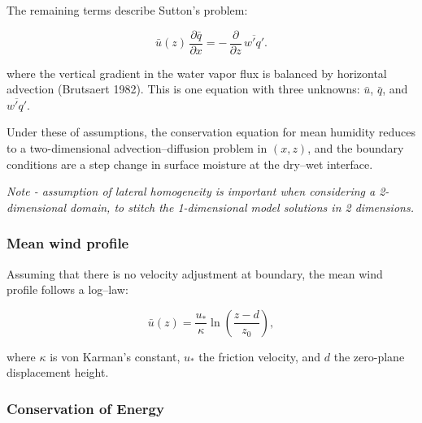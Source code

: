 \documentclass{article}
\begin{document}
    
    
    The remaining terms describe Sutton's problem: 
    
    \begin{equation}
    \bar u (z)\,\frac{\partial \bar q}{\partial x}
    = -\,\frac{\partial}{\partial z}\,\overline{w' q'} .
    \end{equation}
    
    where the vertical gradient in the water vapor flux is balanced by horizontal advection (Brutsaert 1982). This is one equation with three unknowns: $\bar u$, $\bar q$, and $\overline{w' q'}$. 
    
    
    Under these of assumptions, the conservation equation for mean humidity reduces to a two-dimensional advection--diffusion problem in $(x,z)$,
    and the boundary conditions are a step change in surface moisture at the dry--wet interface.
    
    \textit{Note - assumption of lateral homogeneity is important when considering a 2-dimensional domain, to stitch the 1-dimensional model solutions in 2 dimensions. }
    
    \subsubsection*{Mean wind profile}
    
    Assuming that there is no velocity adjustment at boundary,  the mean wind profile follows a log–law: 
    
    \begin{equation}
    \bar u(z) = \frac{u_*}{\kappa} \ln\!\left(\frac{z-d}{z_0}\right),    
    \end{equation}
    
    where $\kappa$ is von Karman's constant, 
    $u_*$ the friction velocity, and 
    $d$ the zero-plane displacement height.
    
    
    \subsubsection*{Conservation of Energy}
    
\end{document}
